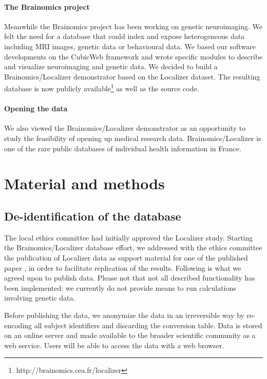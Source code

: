 \documentclass[review]{elsarticle}
\begin{document}
\paragraph{The Brainomics project} Meanwhile the Brainomics project has been working on genetic neuroimaging. We felt the need for a database that could index and expose heterogeneous data including MRI images, genetic data or behavioural data. We based our software developments on the CubicWeb framework and wrote specific modules to describe and visualize neuroimaging and genetic data. We decided to build a Brainomics/Localizer demonstrator based on the Localizer dataset. The resulting database is now publicly available\footnote{http://brainomics.cea.fr/localizer} as well as the source code.

\paragraph{Opening the data} We also viewed the Brainomics/Localizer demonstrator as an opportunity to study the feasibility of opening up medical research data. Brainomics/Localizer is one of the rare public databases of individual health information in France.


\section{Material and methods}

\subsection{De-identification of the database}

The local ethics committee had initially approved the Localizer study. Starting the Brainomics/Localizer database effort, we addressed with the ethics committee the publication of Localizer data as support material for one of the published paper \cite{Pinel2012}, in order to facilitate replication of the results. Following is what we agreed upon to publish data. Please not that not all described functionality has been implemented: we currently do not provide means to run calculations involving genetic data.

Before publishing the data, we anonymize the data in an irreversible way by re-encoding all subject identifiers and discarding the conversion table. Data is stored on an online server and made available to the broader scientific community as a web service. Users will be able to access the data with a web browser.
\end{document}

